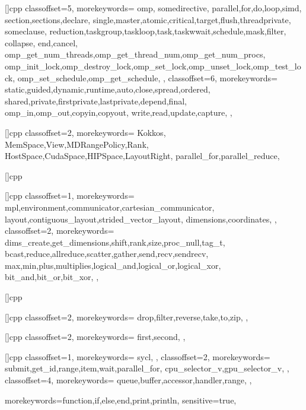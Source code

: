 []{cpp}{
  classoffset=5,
  morekeywords={
    omp,
    somedirective,
    parallel,for,do,loop,simd,
    section,sections,declare,
    single,master,atomic,critical,target,flush,threadprivate,
    someclause,
    reduction,taskgroup,taskloop,task,taskwwait,schedule,mask,filter,
    collapse,
    end,cancel,
    omp_get_num_threads,omp_get_thread_num,omp_get_num_procs,
    omp_init_lock,omp_destroy_lock,omp_set_lock,omp_unset_lock,omp_test_lock,
    omp_set_schedule,omp_get_schedule,
  },
  classoffset=6,
  morekeywords={
    static,guided,dynamic,runtime,auto,close,spread,ordered,
    shared,private,firstprivate,lastprivate,depend,final,
    omp_in,omp_out,copyin,copyout,
    write,read,update,capture,
  },
}

[]{cpp}{
  classoffset=2,
  morekeywords={
    Kokkos,
    MemSpace,View,MDRangePolicy,Rank,
    HostSpace,CudaSpace,HIPSpace,LayoutRight,
    parallel_for,parallel_reduce,
  }
}

[]{cpp}{
}

[]{cpp}{
  classoffset=1,
  morekeywords={
    mpl,environment,communicator,cartesian_communicator,
    layout,contiguous_layout,strided_vector_layout,
    dimensions,coordinates,
  },
  classoffset=2,
  morekeywords={
    dims_create,get_dimensions,shift,rank,size,proc_null,tag_t,
    bcast,reduce,allreduce,scatter,gather,send,recv,sendrecv,  
    max,min,plus,multiplies,logical_and,logical_or,logical_xor,
    bit_and,bit_or,bit_xor,
  },
}

[]{cpp}{
}

[]{cpp}{
  classoffset=2,
  morekeywords={
    drop,filter,reverse,take,to,zip,
  },
}

[]{cpp}{
  classoffset=2,
  morekeywords={
    first,second,
  },
}

[]{cpp}{
  classoffset=1,
  morekeywords={
    sycl,
  },
  classoffset=2,
  morekeywords={
    submit,get_id,range,item,wait,parallel_for,
    cpu_selector_v,gpu_selector_v,
  },
  classoffset=4,
  morekeywords={
    queue,buffer,accessor,handler,range,
  },
}

                  {morekeywords={function,if,else,end,print,println},
                    sensitive=true,
                  }
                  
